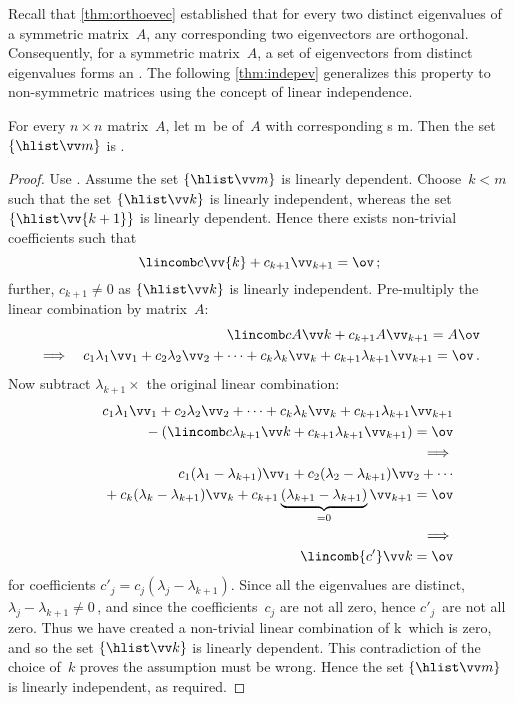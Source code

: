 Recall that \cref{thm:orthoevec} established that for every two distinct {eigenvalue}s of a symmetric matrix~\(A\), any corresponding two {eigenvector}s are {orthogonal}.
Consequently, for a symmetric matrix~\(A\), a set of eigenvectors from distinct eigenvalues forms an .
The following \cref{thm:indepev} generalizes this property to non-symmetric matrices using the concept of linear independence.


\begin{theorem} \label{thm:indepev}
For every \(n\times n\) matrix~\(A\), let \hlist\lambda m\ be  of~\(A\) with corresponding s \hlist\vv m.
Then the set \(\{\hlist \vv m\}\) is .
\end{theorem}
\begin{proof} 
Use .
Assume the set \(\{\hlist \vv m\}\) is linearly dependent.
Choose~\(k<m\) such that the set \(\{\hlist\vv k\}\) is linearly independent, whereas the set \(\{\hlist\vv{k+1}\}\) is linearly dependent.
Hence there exists non-trivial coefficients such that 
\begin{equation*}
\lincomb c\vv{k}+c_{k+1}\vv_{k+1}=\ov\,;
\end{equation*}
further, \(c_{k+1}\neq0\) as \(\{\hlist\vv k\}\) is linearly independent.
Pre-multiply the linear combination by matrix~\(A\):
\begin{eqnarray*}&&
\lincomb c{A\vv}k+c_{k+1}A\vv_{k+1}=A\ov
\\\implies&&
c_1\lambda_1\vv_1+c_2\lambda_2\vv_2+\cdots+c_k\lambda_k\vv_k+c_{k+1}\lambda_{k+1}\vv_{k+1}=\ov\,.
\end{eqnarray*}
Now subtract \(\lambda_{k+1}\times\) the original linear combination:
\begin{eqnarray*}&&
\phantom{{}+(}c_1\lambda_1\vv_1+c_2\lambda_2\vv_2+\cdots+c_k\lambda_k\vv_k+c_{k+1}\lambda_{k+1}\vv_{k+1}
\\&&{}
-\left(\lincomb c{\lambda_{k+1}\vv}{k}
+c_{k+1}\lambda_{k+1}\vv_{k+1}\right)=\ov
\\&&\implies\\&&
c_1(\lambda_1-\lambda_{k+1})\vv_1+c_2(\lambda_2-\lambda_{k+1})\vv_2+\cdots
\\&&{}
+c_k(\lambda_k-\lambda_{k+1})\vv_k
+c_{k+1}\underbrace{(\lambda_{k+1}-\lambda_{k+1})}_{=0}\vv_{k+1}=\ov
\\&&\implies\\&&
\lincomb{c'}\vv k=\ov
\end{eqnarray*}
for coefficients \(c'_j=c_j(\lambda_j-\lambda_{k+1})\).
Since all the eigenvalues are distinct, \(\lambda_j-\lambda_{k+1}\neq0\)\,, and since the coefficients~\(c_j\) are not all zero, hence \(c'_j\)~are not all zero.
Thus we have created a non-trivial linear combination of \hlist \vv k\ which is zero, and so the set \(\{\hlist\vv k\}\) is linearly dependent.
This contradiction of the choice of~\(k\) proves the assumption must be wrong.
Hence the set \(\{\hlist \vv m\}\) is linearly independent, as required.
\end{proof}



